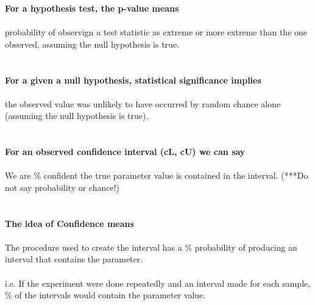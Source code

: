\large \textbf{For a hypothesis test, the p-value means}\normalsize\\~\\
probability of observign a test statistic as extreme or more extreme than the one observed, assuming the null hypothesis is true.\\~\\~\\

\large \textbf{For a given a null hypothesis, statistical significance implies}\normalsize\\~\\
the observed value was unlikely to have occurred by random chance alone (assuming the null hypothesis is true).\\~\\~\\

\large \textbf{For an observed confidence interval (cL, cU) we can say}\normalsize\\~\\
We are \underbar{~~~~~}\% confident the true parameter value is contained in the interval.  (***Do not say probability or chance!)\\~\\~\\

\large \textbf{The idea of Confidence means}\normalsize\\~\\
The procedure used to create the interval has a \underbar{~~~~}\% probability of producing an interval that contains the parameter.\\~\\
i.e. If the experiment were done repeatedly and an interval made for each sample, \underbar{~~~~}\% of the intervals would contain the parameter value.

